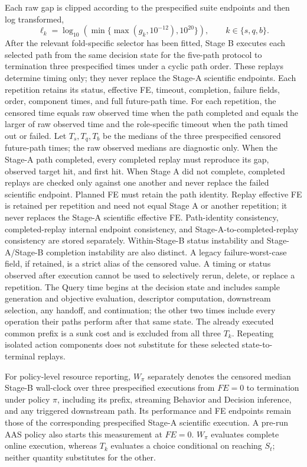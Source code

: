 Each raw gap is clipped according to the prespecified suite endpoints and then
log transformed,
\begin{equation}
  \ell_k=\log_{10}\!\left(\min\{\max(g_k,10^{-12}),10^{20}\}\right),
  \qquad k\in\{s,q,b\}.
  \label{eq:clipped-log-gap}
\end{equation}
After the relevant fold-specific selector has been fitted, Stage B executes
each selected path from the same decision state for the five-path protocol
to termination three prespecified times under a cyclic path order.  These
replays determine timing only; they never replace the Stage-A scientific
endpoints.  Each repetition retains its status, effective FE, timeout,
completion, failure fields, order, component times, and full future-path time.
For each repetition, the censored time equals raw observed time when the path
completed and equals the larger of raw observed time and the role-specific
timeout when the path timed out or failed.  Let $T_s,T_q,T_b$ be the medians of
the three prespecified censored future-path times; the raw observed medians are
diagnostic only.  When the Stage-A path completed, every completed replay must
reproduce its gap, observed target hit, and first hit.  When Stage A did not
complete, completed replays are checked only against one another and never
replace the failed scientific endpoint.
Planned FE must retain the path identity.  Replay effective FE is retained per
repetition and need not equal Stage A or another repetition; it never replaces
the Stage-A scientific effective FE.  Path-identity consistency,
completed-replay internal endpoint consistency, and Stage-A-to-completed-replay
consistency are stored separately.  Within-Stage-B status instability and
Stage-A/Stage-B completion instability are also distinct.  A legacy
failure-worst-case field, if retained, is a strict alias of the censored value.  A
timing or status observed after execution cannot be used to selectively rerun,
delete, or replace a repetition.  The Query time begins at the decision state
and includes sample generation and objective evaluation,
descriptor computation, downstream selection, any handoff, and continuation;
the other two times include every operation their paths perform after that same
state.  The already executed common prefix is a sunk cost and is excluded from
all three $T_k$.  Repeating isolated action components does not substitute for
these selected state-to-terminal replays.

For policy-level resource reporting, $W_\pi$ separately denotes the censored median
Stage-B wall-clock over three prespecified executions from $FE=0$ to termination
under policy $\pi$, including its prefix, streaming Behavior and Decision
inference, and any triggered downstream path.  Its performance and FE endpoints
remain those of the corresponding prespecified Stage-A scientific execution.
A pre-run AAS policy also starts this measurement at $FE=0$.  $W_\pi$ evaluates
complete online execution, whereas $T_k$ evaluates a choice conditional on reaching
$S_t$; neither quantity substitutes for the other.

